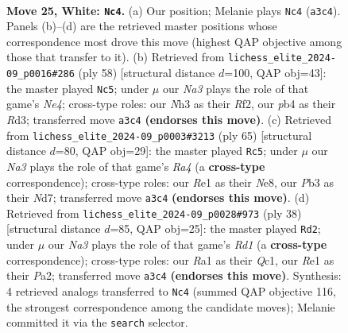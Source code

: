 \documentclass[11pt]{article}
\begin{document}
\begin{figure}[p]
\label{fig:thought-m46}
\end{figure}

\clearpage

\begin{figure}[p]\centering
\begin{subfigure}{0.46\textwidth}\centering
\resizebox{\linewidth}{!}{%
\newchessgame
\chessboard[
  setfen={2b2q2/5pkp/rp3np1/8/Pp6/NP4PN/5PBP/R3R1K1 w - - 0 25},
  showmover=false,
  pgfstyle=straightmove, color=movearrow, markmove={a3-c4}
]}
\caption{}
\end{subfigure}\hfill
\begin{subfigure}{0.46\textwidth}\centering
\resizebox{\linewidth}{!}{%
\newchessgame
\chessboard[
  setfen={8/pp3rbk/4q1pp/3pp3/1P1nN3/3R1PP1/P4RKP/3Q4 w - - 0 30},
  showmover=false,
  pgfstyle=straightmove, color=movearrow, markmove={e4-c5}
]}
\caption{}
\end{subfigure}
\\[4pt]
\begin{subfigure}{0.46\textwidth}\centering
\resizebox{\linewidth}{!}{%
\newchessgame
\chessboard[
  setfen={r3n3/3n1pkp/6p1/r3P3/4P3/pBQ3PP/R4PK1/8 b - - 0 33},
  showmover=false,
  pgfstyle=straightmove, color=movearrow, markmove={a5-c5}
]}
\caption{}
\end{subfigure}\hfill
\begin{subfigure}{0.46\textwidth}\centering
\resizebox{\linewidth}{!}{%
\newchessgame
\chessboard[
  setfen={3r1qk1/p1n2ppp/1p6/2pNP3/8/1P4P1/P3bPBP/2QR2K1 w - - 0 20},
  showmover=false,
  pgfstyle=straightmove, color=movearrow, markmove={d1-d2}
]}
\caption{}
\end{subfigure}
\caption{\textbf{Move 25, White: \texttt{Nc4}.} (a) Our position; Melanie plays \texttt{Nc4} (\texttt{a3c4}). Panels (b)--(d) are the retrieved master positions whose correspondence most drove this move (highest QAP objective among those that transfer to it). (b) Retrieved from \texttt{lichess\_elite\_2024-09\_p0016\#286} (ply 58) [structural distance $d$=100, QAP obj=43]: the master played \texttt{Nc5}; under $\mu$ our \emph{Na3} plays the role of that game's \emph{Ne4}; cross-type roles: our \emph{N}h3 as their \emph{R}f2, our \emph{p}b4 as their \emph{R}d3; transferred move \texttt{a3c4} \textbf{(endorses this move)}. (c) Retrieved from \texttt{lichess\_elite\_2024-09\_p0003\#3213} (ply 65) [structural distance $d$=80, QAP obj=29]: the master played \texttt{Rc5}; under $\mu$ our \emph{Na3} plays the role of that game's \emph{Ra4} (a \textbf{cross-type} correspondence); cross-type roles: our \emph{R}e1 as their \emph{N}e8, our \emph{P}b3 as their \emph{N}d7; transferred move \texttt{a3c4} \textbf{(endorses this move)}. (d) Retrieved from \texttt{lichess\_elite\_2024-09\_p0028\#973} (ply 38) [structural distance $d$=85, QAP obj=25]: the master played \texttt{Rd2}; under $\mu$ our \emph{Na3} plays the role of that game's \emph{Rd1} (a \textbf{cross-type} correspondence); cross-type roles: our \emph{R}a1 as their \emph{Q}c1, our \emph{R}e1 as their \emph{P}a2; transferred move \texttt{a3c4} \textbf{(endorses this move)}. Synthesis: 4 retrieved analogs transferred to \texttt{Nc4} (summed QAP objective 116, the strongest correspondence among the candidate moves); Melanie committed it via the \texttt{search} selector.}

\end{figure}
\end{document}

